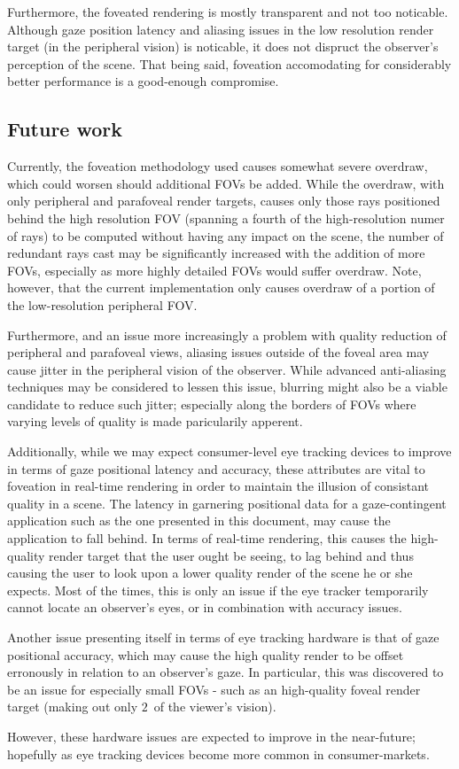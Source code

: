 Furthermore, the foveated rendering is mostly transparent and not too noticable.
Although gaze position latency and aliasing issues in the low resolution render target (in the peripheral vision) is noticable, it does not dispruct the observer's perception of the scene.
That being said, foveation accomodating for considerably better performance is a good-enough compromise.

\subsection{Future work}
Currently, the foveation methodology used causes somewhat severe overdraw, which could worsen should additional FOVs be added.
While the overdraw, with only peripheral and parafoveal render targets, causes only those rays positioned behind the high resolution FOV (spanning a fourth of the high-resolution numer of rays) to be computed without having any impact on the scene, the number of redundant rays cast may be significantly increased with the addition of more FOVs, especially as more highly detailed FOVs would suffer overdraw.
Note, however, that the current implementation only causes overdraw of a portion of the low-resolution peripheral FOV.

Furthermore, and an issue more increasingly a problem with quality reduction of peripheral and parafoveal views, aliasing issues outside of the foveal area may cause jitter in the peripheral vision of the observer.
While advanced anti-aliasing techniques may be considered to lessen this issue, blurring might also be a viable candidate to reduce such jitter; especially along the borders of FOVs where varying levels of quality is made paricularily apperent.

Additionally, while we may expect consumer-level eye tracking devices to improve in terms of gaze positional latency and accuracy, these attributes are vital to foveation in real-time rendering in order to maintain the illusion of consistant quality in a scene.
The latency in garnering positional data for a gaze-contingent application such as the one presented in this document, may cause the application to fall behind.
In terms of real-time rendering, this causes the high-quality render target that the user ought be seeing, to lag behind and thus causing the user to look upon a lower quality render of the scene he or she expects.
Most of the times, this is only an issue if the eye tracker temporarily cannot locate an observer's eyes, or in combination with accuracy issues.

Another issue presenting itself in terms of eye tracking hardware is that of gaze positional accuracy, which may cause the high quality render to be offset erronously in relation to an observer's gaze.
In particular, this was discovered to be an issue for especially small FOVs - such as an high-quality foveal render target (making out only $2$\degree\ of the viewer's vision).

However, these hardware issues are expected to improve in the near-future; hopefully as eye tracking devices become more common in consumer-markets.
